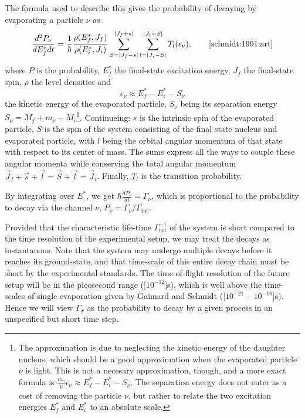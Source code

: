 The formula used to describe this gives the probability of decaying by evaporating a particle $\nu$ as
\begin{equation}
\frac{d^2 P_\nu}{dE_f^* dt} = \frac{1}{\hbar} \frac{\rho(E_f^*,J_f)}{\rho(E_i^*,J_i)} \sum_{S=|J_f-s|}^{|J_f+s|}\sum_{l=|J_i-S|}^{|J_i+S|} T_l(\epsilon_\nu),\qquad\cite{schmidt:1991:art}\label{eq:ew}
\end{equation}
where $P$ is the probability, $E_f^*$ the final-state excitation energy, $J_f$ the final-state spin, $\rho$ the level densities and 
\begin{equation}
\epsilon_\nu \approx E_f^*-E_i^*-S_\nu\label{eq:kine}
\end{equation}
the kinetic energy of the evaporated particle, $S_\nu$ being its separation energy $S_\nu = M_f + m_\nu - M_i$\footnote{The approximation is due to neglecting the kinetic energy of the daughter nucleus, which should be a good approximation when the evaporated particle $\nu$ is light. This is not a necesary approximation, though, and a more exact formula is $\tfrac{m_\nu}{\mu}\epsilon_\nu \approx E_f^*-E_i^*-S_\nu$. The separation energy does not enter as a cost of removing the particle $\nu$, but rather to relate the two excitation energies $E_f^*$ and $E_i^*$ to an absolute scale.}. 
 Continueing: $s$ is the intrinsic spin of the evaporated particle, $S$ is the spin of the system consisting of the final state nucleus and evaporated particle, with $l$ being the orbital angular momentum of that state with respect to its center of mass. The sums express all the ways to couple these angular momenta while conserving the total angular momentum $\vec{J}_f+\vec{s} +\vec{l}= \vec{S} +\vec{l}= \vec{J}_i$. Finally, $T_l$ is the transition probability.%

By integrating over $E^*$, we get $\hbar \frac{d P_\nu}{dt} = \Gamma_\nu$, which is proportional to the probability to decay via the channel $\nu$, $P_\nu = \Gamma_\nu/\Gamma_{\text{tot}}$. 

Provided that the characteristic life-time $\Gamma_\text{tot}^{-1}$ of the system is short compared to the time resolution of the experimental setup, we may treat the decays as instantanous. Note that the system may undergo multiple decays before it reaches its ground-state, and that time-scale of this entire decay chain must be short by the experimental standards. 
The time-of-flight resolution of the future \rtb{} setup will be in the picosecond range (\unit[$10^{-12}$]{s})\cite{r3b:online}, which is well above the time-scales of single evaporation given by Gaimard and Schmidt (\unit[$10^{-21}$ -- $10^{-16}$]{s})\cite{gaimard:1991:art}. Hence we will view $\Gamma_x$ as the probability to decay by a given process in an unspecified but short time step.

